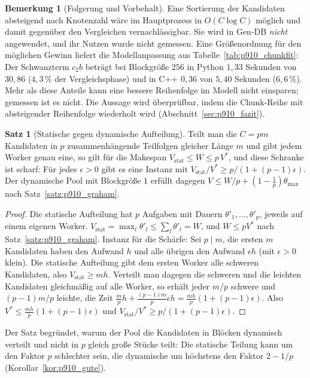 \documentclass[a4paper,12pt, twoside]{report}
\theoremstyle{definition}
\newtheorem{satz}{Satz}
\newtheorem{bemerkung}{Bemerkung}
\begin{document}
\begin{bemerkung}[Folgerung und Vorbehalt]
\label{bem:p910_umsortieren}
Eine Sortierung der Kandidaten absteigend nach Knotenzahl wäre im Hauptprozess in $O(C\log C)$ möglich und damit gegenüber den Vergleichen vernachlässigbar. Sie wird in Gen-DB \emph{nicht} angewendet, und ihr Nutzen wurde nicht gemessen. Eine Größenordnung für den möglichen Gewinn liefert die Modellanpassung aus Tabelle~\ref{tab:p910_chunkfit}: Der Schwanzterm $c_2b$ beträgt bei Blockgröße $256$ in Python $1{,}33$ Sekunden von $30{,}86$ ($4{,}3\,\%$ der Vergleichsphase) und in C++ $0{,}36$ von $5{,}40$ Sekunden ($6{,}6\,\%$). Mehr als diese Anteile kann eine bessere Reihenfolge im Modell nicht einsparen; gemessen ist es nicht. Die Aussage wird überprüfbar, indem die Chunk-Reihe mit absteigender Reihenfolge wiederholt wird (Abschnitt~\ref{sec:p910_fazit}).
\end{bemerkung}

\begin{satz}[Statische gegen dynamische Aufteilung]
\label{satz:p910_statisch}
Teilt man die $C=pm$ Kandidaten in $p$ zusammenhängende Teilfolgen gleicher Länge $m$ und gibt jedem Worker genau eine, so gilt für die Makespan $V_{\mathrm{stat}}\le W\le p\,V^\ast$, und diese Schranke ist scharf: Für jedes $\epsilon>0$ gibt es eine Instanz mit $V_{\mathrm{stat}}/V^\ast\ge p/(1+(p-1)\epsilon)$. Der dynamische Pool mit Blockgröße $1$ erfüllt dagegen $V\le W/p+(1-\frac1p)\theta_{\max}$ nach Satz~\ref{satz:p910_graham}.
\end{satz}

\begin{proof}
Die statische Aufteilung hat $p$ Aufgaben mit Dauern $\theta'_1,\dots,\theta'_p$, jeweils auf einem eigenen Worker. $V_{\mathrm{stat}}=\max_l\theta'_l\le\sum_l\theta'_l=W$, und $W\le pV^\ast$ nach Satz~\ref{satz:p910_graham}. Instanz für die Schärfe: Sei $p\mid m$, die ersten $m$ Kandidaten haben den Aufwand $h$ und alle übrigen den Aufwand $\epsilon h$ (mit $\epsilon>0$ klein). Die statische Aufteilung gibt dem ersten Worker alle schweren Kandidaten, also $V_{\mathrm{stat}}\ge mh$. Verteilt man dagegen die schweren und die leichten Kandidaten gleichmäßig auf alle Worker, so erhält jeder $m/p$ schwere und $(p-1)m/p$ leichte, die Zeit $\frac mp h+\frac{(p-1)m}{p}\epsilon h=\frac{mh}{p}(1+(p-1)\epsilon)$. Also $V^\ast\le\frac{mh}p(1+(p-1)\epsilon)$ und $V_{\mathrm{stat}}/V^\ast\ge p/(1+(p-1)\epsilon)$.
\end{proof}

Der Satz begründet, warum der Pool die Kandidaten in Blöcken dynamisch verteilt und nicht in $p$ gleich große Stücke teilt: Die statische Teilung kann um den Faktor $p$ schlechter sein, die dynamische um höchstens den Faktor $2-1/p$ (Korollar~\ref{kor:p910_gute}).
\end{document}
